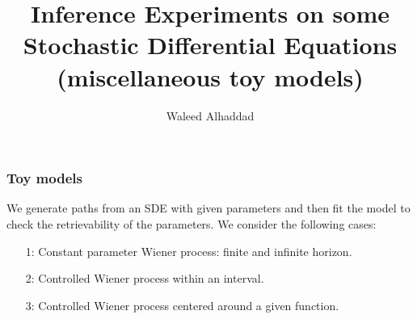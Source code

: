 \documentclass[aspectratio=169]{beamer}\usepackage[utf8]{inputenc}
\title{Inference  Experiments on some Stochastic Differential Equations \\ (miscellaneous toy models)}
\subtitle{ Waleed Alhaddad}
\begin{document}
\begin{frame}
\titlepage
\end{frame}
%
%
%
%


%
%
%
%
%


\begin{frame}\frametitle{ Toy models }
We generate paths from an SDE  with given parameters and then fit the model to check the retrievability of the parameters. We consider the following cases:
\begin{itemize}
\item[1:]  Constant parameter Wiener process: finite and infinite horizon.
\item[2:]  Controlled Wiener process within an interval.
\item[3:]  Controlled Wiener process centered around a given function. 
\end{itemize}
\end{frame}
\end{document}
